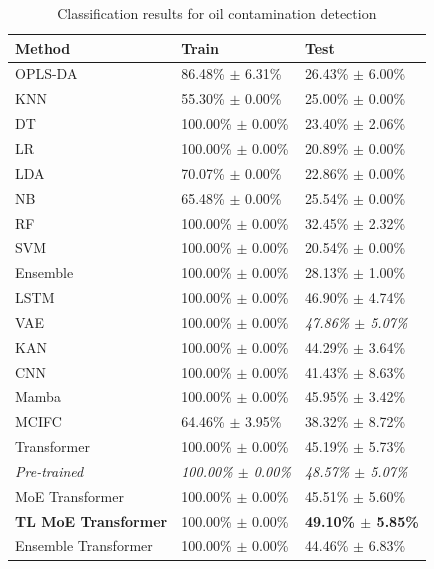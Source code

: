 \begin{table}[t]
    \centering
    \caption{Classification results for oil contamination detection}
    \label{tab:results_oil}
    \begin{tabular}{l|l|l}
        \hline
        Method & Train & Test \\
        \hline
        OPLS-DA & 86.48\% $\pm$ 6.31\% & 26.43\% $\pm$ 6.00\% \\
        KNN & 55.30\% $\pm$ 0.00\% & 25.00\% $\pm$ 0.00\% \\
        DT & 100.00\% $\pm$ 0.00\% & 23.40\% $\pm$ 2.06\% \\
        LR & 100.00\% $\pm$ 0.00\% & 20.89\% $\pm$ 0.00\% \\
        LDA & 70.07\% $\pm$ 0.00\% & 22.86\% $\pm$ 0.00\% \\
        NB & 65.48\% $\pm$ 0.00\% & 25.54\% $\pm$ 0.00\% \\
        RF & 100.00\% $\pm$ 0.00\% & 32.45\% $\pm$ 2.32\% \\
        SVM & 100.00\% $\pm$ 0.00\% & 20.54\% $\pm$ 0.00\% \\
        Ensemble & 100.00\% $\pm$ 0.00\% & 28.13\% $\pm$ 1.00\% \\
        LSTM & 100.00\% $\pm$ 0.00\% & 46.90\% $\pm$ 4.74\% \\
        VAE & 100.00\% $\pm$ 0.00\% & \textit{47.86\% $\pm$ 5.07\%} \\
        KAN & 100.00\% $\pm$ 0.00\% & 44.29\% $\pm$ 3.64\% \\
        CNN & 100.00\% $\pm$ 0.00\% & 41.43\% $\pm$ 8.63\% \\
        Mamba & 100.00\% $\pm$ 0.00\% & 45.95\% $\pm$ 3.42\% \\
        MCIFC & 64.46\% $\pm$ 3.95\% & 38.32\% $\pm$ 8.72\% \\
        Transformer & 100.00\% $\pm$ 0.00\% & 45.19\% $\pm$ 5.73\% \\
        \textit{Pre-trained} & \textit{100.00\% $\pm$ 0.00\%} & \textit{48.57\% $\pm$ 5.07\%} \\
        MoE Transformer & 100.00\% $\pm$ 0.00\% & 45.51\% $\pm$ 5.60\% \\
        \textbf{TL MoE Transformer} & 100.00\% $\pm$ 0.00\% & \textbf{49.10\% $\pm$ 5.85\%} \\
        Ensemble Transformer & 100.00\% $\pm$ 0.00\% & 44.46\% $\pm$ 6.83\% \\ 
        \hline
    \end{tabular}
\end{table}


